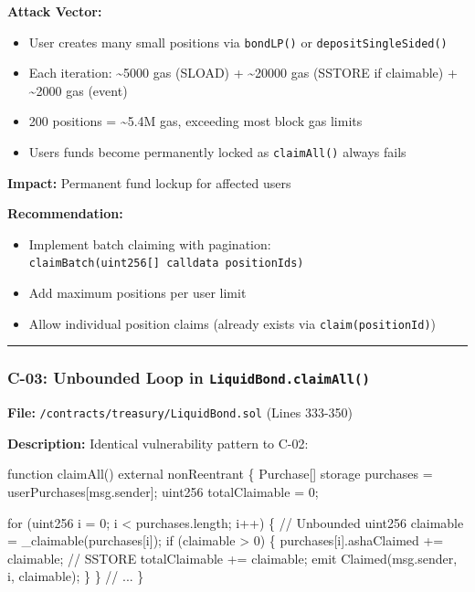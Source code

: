 \documentclass[
]{article}
\newenvironment{Shaded}{}{}
\newcommand{\NormalTok}[1]{#1}
\providecommand{\tightlist}{%
  \setlength{\itemsep}{0pt}\setlength{\parskip}{0pt}}
\begin{document}
\textbf{Attack Vector:}

\begin{itemize}
\tightlist
\item
  User creates many small positions via \texttt{bondLP()} or
  \texttt{depositSingleSided()}
\item
  Each iteration: \textasciitilde5000 gas (SLOAD) + \textasciitilde20000
  gas (SSTORE if claimable) + \textasciitilde2000 gas (event)
\item
  200 positions = \textasciitilde5.4M gas, exceeding most block gas
  limits
\item
  User\textquotesingle s funds become permanently locked as
  \texttt{claimAll()} always fails
\end{itemize}

\textbf{Impact:} Permanent fund lockup for affected users

\textbf{Recommendation:}

\begin{itemize}
\tightlist
\item
  Implement batch claiming with pagination:
  \texttt{claimBatch(uint256{[}{]}\ calldata\ positionIds)}
\item
  Add maximum positions per user limit
\item
  Allow individual position claims (already exists via
  \texttt{claim(positionId)})
\end{itemize}

\begin{center}\rule{0.5\linewidth}{0.5pt}\end{center}

\subsubsection{\texorpdfstring{C-03: Unbounded Loop in
\texttt{LiquidBond.claimAll()}}{C-03: Unbounded Loop in LiquidBond.claimAll()}}\label{c-03-unbounded-loop-in-liquidbondclaimall}

\textbf{File:} \texttt{/contracts/treasury/LiquidBond.sol} (Lines
333-350)

\textbf{Description:} Identical vulnerability pattern to C-02:

\begin{Shaded}
\begin{Highlighting}[]
\NormalTok{function claimAll() external nonReentrant \{}
\NormalTok{    Purchase[] storage purchases = userPurchases[msg.sender];}
\NormalTok{    uint256 totalClaimable = 0;}

\NormalTok{    for (uint256 i = 0; i \textless{} purchases.length; i++) \{  // Unbounded}
\NormalTok{        uint256 claimable = \_claimable(purchases[i]);}
\NormalTok{        if (claimable \textgreater{} 0) \{}
\NormalTok{            purchases[i].ashaClaimed += claimable;     // SSTORE}
\NormalTok{            totalClaimable += claimable;}
\NormalTok{            emit Claimed(msg.sender, i, claimable);}
\NormalTok{        \}}
\NormalTok{    \}}
\NormalTok{    // ...}
\NormalTok{\}}
\end{Highlighting}
\end{Shaded}
\end{document}
